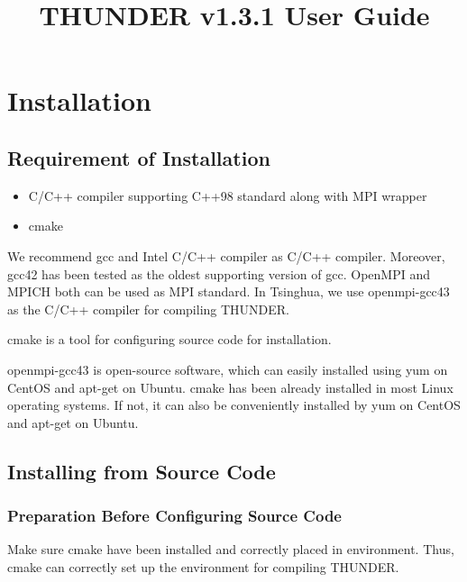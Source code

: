 \documentclass{article}
\begin{document}
    \title{THUNDER v1.3.1 User Guide}
    \maketitle
    
    \section{Installation}
    
        \subsection{Requirement of Installation}
        
            \begin{itemize}
                \item C/C++ compiler supporting C++98 standard along with MPI wrapper
                \item \textsf{cmake}
            \end{itemize}
            
            We recommend \textsf{gcc} and Intel C/C++ compiler as C/C++ compiler. Moreover, \textsf{gcc42} has been tested as the oldest supporting version of \textsf{gcc}. OpenMPI and MPICH both can be used as MPI standard. In Tsinghua, we use \textsf{openmpi-gcc43} as the C/C++ compiler for compiling THUNDER.
            
            \textsf{cmake} is a tool for configuring source code for installation.
            
            \textsf{openmpi-gcc43} is open-source software, which can easily installed using \textsf{yum} on CentOS and \textsf{apt-get} on Ubuntu. \textsf{cmake} has been already installed in most Linux operating systems. If not, it can also be conveniently installed by \textsf{yum} on CentOS and \textsf{apt-get} on Ubuntu.
        
        \subsection{Installing from Source Code}
        
            \subsubsection{Preparation Before Configuring Source Code}
            
                Make sure \textsf{cmake} have been installed and correctly placed in environment. Thus, \textsf{cmake} can correctly set up the environment for compiling THUNDER.
        
\end{document}
